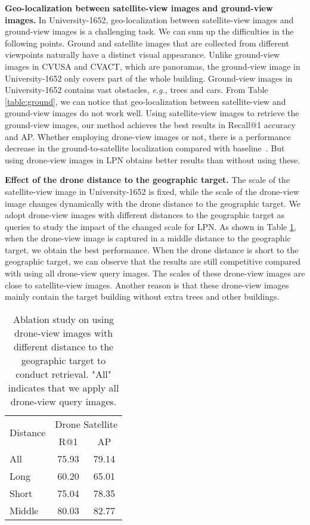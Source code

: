 \documentclass[journal]{IEEEtran}
\def\eg{\emph{e.g.}}
\begin{document}
\textbf{Geo-localization between satellite-view images and ground-view images.} In University-1652, geo-localization between satellite-view images and ground-view images is a challenging task. We can sum up the difficulties in the following points.  Ground and satellite images that are collected from different viewpoints naturally have a distinct visual appearance.  Unlike ground-view images in CVUSA and CVACT, which are panoramas, the ground-view image in University-1652 only covers part of the whole building.  Ground-view images in University-1652 contains vast obstacles, \eg, trees and cars. From Table \ref{table:ground}, we can notice that geo-localization between satellite-view and ground-view images do not work well. Using satellite-view images to retrieve the ground-view images, our method achieves the best results in Recall@1 accuracy and AP. Whether employing drone-view images or not, there is a performance decrease in the ground-to-satellite localization compared with baseline~\cite{zheng_university-1652_nodate}. But using drone-view images in LPN obtains better results than without using these.
\par
\textbf{Effect of the drone distance to the geographic target.} The scale of the satellite-view image in University-1652 is fixed, while the scale of the drone-view image changes dynamically with the drone distance to the geographic target. We adopt drone-view images with different distances to the geographic target as queries to study the impact of the changed scale for LPN. As shown in Table \ref{table:scale}, when the drone-view image is captured in a middle distance to the geographic target, we obtain the best performance. When the drone distance is short to the geographic target, we can observe that the results are still competitive compared with using all drone-view query images. The scales of these drone-view images are close to satellite-view images. Another reason is that these drone-view images mainly contain the target building without extra trees and other buildings.
\par
\setlength{\tabcolsep}{28pt}
\begin{table}
\small
\caption{Ablation study on using drone-view images with different distance to the geographic target to conduct retrieval. "All" indicates that we apply all drone-view query images.
}
\begin{center}
\begin{tabular}{l|cc}
\hline
\multirow{2}{*}{Distance}& \multicolumn{2}{c}{Drone  Satellite} \\
  & R@1 & AP \\
\shline
All  & 75.93 & 79.14  \\
Long & 60.20 & 65.01 \\
Short  & 75.04 & 78.35  \\
Middle & 80.03 & 82.77  \\
\hline
\end{tabular}
\end{center}
\label{table:scale}
\end{table}
\end{document}
